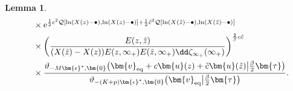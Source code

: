 \documentclass[10pt,a4paper]{amsart}
\numberwithin{equation}{section}
\newtheorem{Lemma}[Theorem]{Lemma}
\begin{document}
\begin{Lemma}
\begin{align*}
	& \quad{} \times{\rm e}^{\frac{1}{2}c^2 \mathcal{Q}[\ln(X(z) - \bullet),\ln(X(z) - \bullet)] + \frac{1}{2} \tilde{c}^2 \mathcal{Q}[\ln(X(\tilde{z}) - \bullet),\ln(X(\tilde{z}) - \bullet)]} \\
												 & \quad{} \times \biggl(\frac{E(z,\tilde{z})}{(X(\tilde{z}) - X(z))E(z,\infty_+)E(\tilde{z},\infty_+) \dd \zeta_{\infty_+}(\infty_+)}\biggr)^{\frac{2}{\beta}c\tilde{c}} \\
&\quad{}\times \frac{\vartheta_{-M\bm{\epsilon}^*,\bm{0}}\bigl(\bm{v}_{{\rm eq}} + c\bm{u}(z) + \tilde{c}\bm{u}(\tilde{z}) \big| \frac{\beta}{2} \bm{\tau}\bigr)}{\vartheta_{-(K+p)\bm{\epsilon}^{*},\bm{0}}\bigl(\bm{v}_{{\rm eq}}\big|\frac{\beta}{2}\bm{\tau}\bigr)}.
\end{align*}
\end{Lemma}
\end{document}
